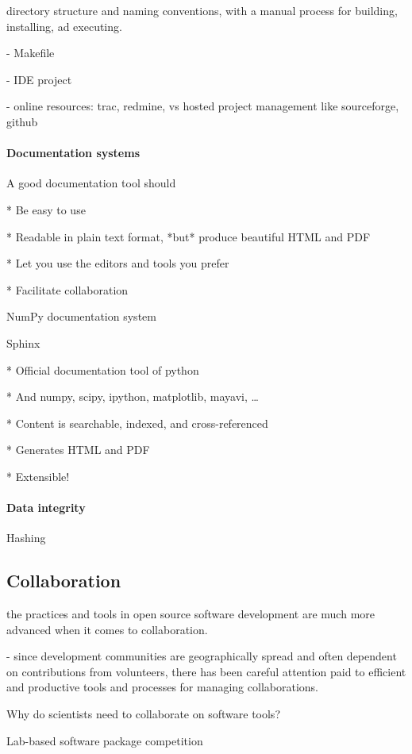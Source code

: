 \documentclass[ChapterTOCs,krantz2]{krantz} %
\begin{document}
directory structure and naming conventions, with a manual process
for building, installing, ad executing.

- Makefile

- IDE project

- online resources: trac, redmine, vs hosted project management like
sourceforge, github

\paragraph{ {\bf Documentation systems}}

A good documentation tool should

* Be easy to use

* Readable in plain text format, *but* produce beautiful HTML and PDF

* Let you use the editors and tools you prefer

* Facilitate collaboration

NumPy documentation system \cite{SciPyProceedings_27}

Sphinx

* Official documentation tool of python

* And numpy, scipy, ipython, matplotlib, mayavi, \ldots

* Content is searchable, indexed, and cross-referenced

* Generates HTML and PDF

* Extensible!

\paragraph{ {\bf Data integrity}}

Hashing


\subsection{Collaboration}

the practices and tools in open source software development
are much more advanced when it comes to collaboration.

- since development communities are geographically spread
and often dependent on contributions from volunteers, there
has been careful attention paid to efficient and productive
tools and processes for managing collaborations.

Why do scientists need to collaborate on software tools?

Lab-based software package competition
\end{document}
